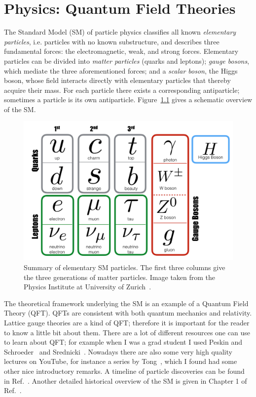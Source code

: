 \chapter{Physics: Quantum Field Theories}

The Standard Model (SM) of particle physics classifies all known
{\it elementary particles}, i.e. particles with no known substructure,
and describes three fundamental forces: the electromagnetic,
weak, and strong forces. Elementary particles can be divided into
{\it matter particles} (quarks and leptons); {\it gauge bosons}, which mediate
the three aforementioned forces; and a {\it scalar boson}, the Higgs boson,
whose field interacts directly with elementary particles that thereby
acquire their mass. For each particle there exists a corresponding
antiparticle; sometimes a particle is its own antiparticle.
Figure~\ref{fig:SM} gives a schematic overview of the SM.

\begin{figure}
  \centering
  \includegraphics[width=0.80\linewidth]{figs/SM.png}
  \caption{Summary of elementary SM particles. The first three columns give
           the three generations of matter particles. Image taken
           from the Physics Institute at University of 
           Zurich~\cite{zurich_SM}.}
  \label{fig:SM}
\end{figure}

The theoretical framework underlying the SM is an example of a Quantum 
Field Theory (QFT). QFTs are consistent with both quantum mechanics and
relativity. Lattice gauge theories are a kind of QFT; therefore it is
important for the reader to know a little bit about them. There are a lot
of different resources one can use to learn about QFT; for example when I was a
grad student I used Peskin and Schroeder~\cite{peskin_introduction_1995}
and Srednicki~\cite{srednicki_quantum_2007}.
Nowadays there are also some very high quality lectures on YouTube,
for instance a series by Tong~\cite{tongQFT}, which I found had some other nice
introductory remarks. 
A timeline of particle discoveries can be found in
Ref.~\cite{wiki_particle_discoveries}. Another detailed historical overview
of the SM is given in Chapter 1 of Ref.~\cite{griffiths_introduction_2007}.

